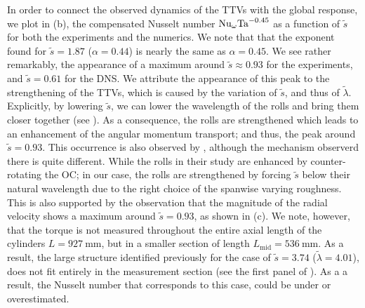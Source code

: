 In order to connect the observed dynamics of the TTVs with the global response, we plot in (b), the compensated Nusselt number $\text{Nu}_\omega \text{Ta}^{-0.45}$ as a function of $\tilde{s}$ for both the experiments and the numerics. We note that that the exponent found for $\tilde{s}=1.87$ ($\alpha=0.44$) is nearly the same as $\alpha=0.45$. We see rather remarkably, the appearance of a maximum around $\tilde{s}\approx 0.93$ for the experiments, and $\tilde{s} = 0.61$ for the DNS. We attribute the appearance of this peak to the strengthening of the TTVs, which is caused by the variation of $\tilde{s}$, and thus of $\tilde{\lambda}$. Explicitly, by lowering $\tilde{s}$, we can lower the wavelength of the rolls and bring them closer together (see ). As a consequence, the rolls are strengthened which leads to an enhancement of the angular momentum transport; and thus, the peak around $\tilde{s} = 0.93$. This occurrence is also observed by \citet{Huisman2014}, although the mechanism observerd there is quite different. While the rolls in their study are enhanced by counter-rotating the OC; in our case, the rolls are strengthened by forcing $\tilde{s}$ below their natural wavelength due to the right choice of the spanwise varying roughness. This is also supported by the observation that the magnitude of the radial velocity shows a maximum around $\tilde{s}=0.93$, as shown in (c). We note, however, that the torque is not measured throughout the entire axial length of the cylinders $L=\SI{927}{\mm}$, but in a smaller section of length $L_{\text{mid}}=\SI{536}{\mm}$. As a result, the large structure identified previously for the case of $\tilde{s}=3.74$ ($\tilde{\lambda}=4.01$), does not fit entirely in the measurement section (see the first panel of ). As a a result, the Nusselt number that corresponds to this case, could be under or overestimated.

